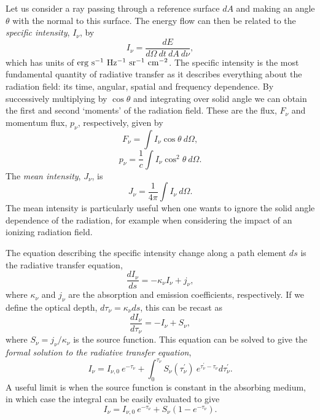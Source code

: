 Let us consider a ray passing through a reference surface $dA$ and 
making an angle $\theta$ with the normal to this surface. The energy
flow can then be related to the
{\em specific intensity}, $I_\nu$, by
\begin{equation}
I_\nu = \frac{dE}{d\Omega~dt~dA~d\nu},
\end{equation}
which has units of ${\rm erg~s^{-1}~Hz^{-1}~sr^{-1}~cm^{-2}}$. The specific
intensity is the most fundamental quantity of radiative transfer as it describes 
everything about the radiation field: its time, angular, spatial and frequency
dependence.
By successively multiplying by $\cos \theta$ and integrating over solid angle we 
can obtain the first and second `moments' of the radiation field. These
are the flux, $F_\nu$ and momentum flux, $p_\nu$, respectively, given by
\begin{equation}
F_\nu = \int I_\nu \cos \theta~d \Omega,
\end{equation}
\begin{equation}
p_\nu = \frac{1}{c} \int I_\nu \cos^2 \theta~d \Omega.
\end{equation}
The {\em mean intensity}, $J_\nu$, is
\begin{equation}
J_\nu = \frac{1}{4 \pi} \int I_\nu~d \Omega.
\end{equation}
The mean intensity is particularly
useful when one wants to ignore the solid angle dependence of the radiation,
for example when considering the impact of an ionizing radiation field.

The equation describing the specific intensity change along a path element $ds$
is the radiative transfer equation, 
\begin{equation}
\frac{d I_\nu}{ds} = -\kappa_\nu I_\nu + j_\nu, 
\label{eq:rte}
\end{equation}
where $\kappa_\nu$ and $j_\nu$ are the absorption and emission coefficients, respectively.
If we define the optical depth, $d \tau_\nu = \kappa_\nu ds$, this can be recast as
\begin{equation}
\frac{d I_\nu}{d \tau_\nu} = -I_\nu + S_\nu,
\label{eq:formal_rte}
\end{equation}
where $S_\nu=j_\nu/\kappa_\nu$ is the source function. This equation
can be solved to give the {\em formal solution to the radiative transfer equation},
\begin{equation}
I_\nu = I_{\nu,0}~e^{-\tau_\nu} + \int^{\tau_\nu}_0 S_\nu (\tau^\prime_\nu)~e^{\tau^\prime_\nu-\tau_\nu} d \tau^\prime_\nu.
\label{eq:rte_solution}
\end{equation}
A useful limit is when the source function is constant in the absorbing medium, in which case
the integral can be easily evaluated to give
\begin{equation}
I_\nu = I_{\nu,0}~e^{-\tau_\nu} + S_\nu (1 - e^{-\tau_\nu}).
\label{eq:rte_solution}
\end{equation}

